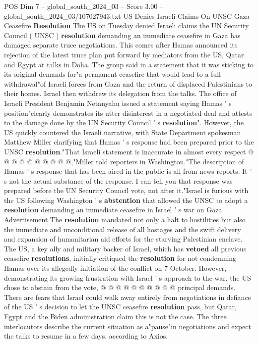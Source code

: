 \begin{textsample}{POS Dim 7 – global\_south\_2024\_03 – Score 3.00 – global\_south\_2024\_03/107027943.txt}  \label{ex:f7_pos_028}
US Denies Israeli Claims On UNSC Gaza Ceasefire \textbf{Resolution} The US on Tuesday denied Israeli claims the UN Security Council ( UNSC ) \textbf{resolution} demanding an immediate ceasefire in Gaza has damaged separate truce negotiations.
This comes after Hamas announced its rejection of the latest truce plan put forward by mediators from the US, Qatar and Egypt at talks in Doha.
The group said in a statement that it was sticking to its original demands for"a permanent ceasefire that would lead to a full withdrawal"of Israeli forces from Gaza and the return of displaced Palestinians to their homes.
Israel then withdrew its delegation from the talks.
The office of Israeli President Benjamin Netanyahu issued a statement saying Hamas ' s position"clearly demonstrates its utter disinterest in a negotiated deal and attests to the damage done by the UN Security Council ' s \textbf{resolution}".
However, the US quickly countered the Israeli narrative, with State Department spokesman Matthew Miller clarifying that Hamas ' s response had been prepared prior to the UNSC \textbf{resolution}."That Israeli statement is inaccurate in almost every respect @ @ @ @ @ @ @ @ @ @,"Miller told reporters in Washington."The description of Hamas ' s response that has been aired in the public is all from news reports.
It ' s not the actual substance of the response.
I can tell you that response was prepared before the UN Security Council vote, not after it."Israel is furious with the US following Washington ' s \textbf{abstention} that allowed the UNSC to adopt a \textbf{resolution} demanding an immediate ceasefire in Israel ' s war on Gaza.
Advertisement The \textbf{resolution} mandated not only a halt to hostilities but also the immediate and unconditional release of all hostages and the swift delivery and expansion of humanitarian aid efforts for the starving Palestinian enclave.
The US, a key ally and military backer of Israel, which has \textbf{vetoed} all previous ceasefire \textbf{resolutions}, initially critiqued the \textbf{resolution} for not condemning Hamas over its allegedly initiation of the conflict on 7 October.
However, demonstrating its growing frustration with Israel ' s approach to the war, the US chose to abstain from the vote, @ @ @ @ @ @ @ @ @ @ principal demands.
There are fears that Israel could walk away entirely from negotiations in defiance of the US ' s decision to let the UNSC ceasefire \textbf{resolution} pass, but Qatar, Egypt and the Biden administration claim this is not the case.
The three interlocutors describe the current situation as a"pause"in negotiations and expect the talks to resume in a few days, according to Axios.

\end{textsample}
